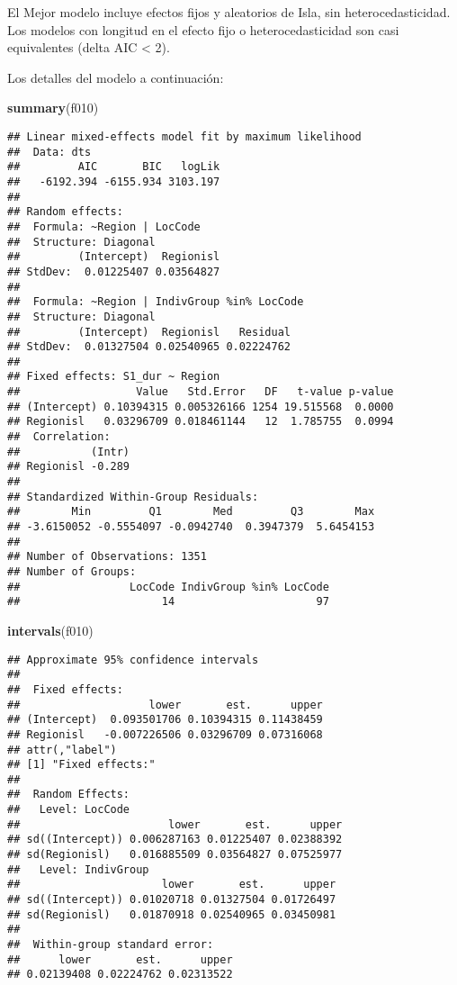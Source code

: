 \documentclass[]{article}
\newenvironment{Shaded}{\begin{snugshade}}{\end{snugshade}}
\newcommand{\KeywordTok}[1]{\textcolor[rgb]{0.13,0.29,0.53}{\textbf{#1}}}
\newcommand{\NormalTok}[1]{#1}
\begin{document}
El Mejor modelo incluye efectos fijos y aleatorios de Isla, sin
heterocedasticidad. Los modelos con longitud en el efecto fijo o
heterocedasticidad son casi equivalentes (delta AIC \textless{} 2).

Los detalles del modelo a continuación:

\begin{Shaded}
\begin{Highlighting}[]
\KeywordTok{summary}\NormalTok{(f010)}
\end{Highlighting}
\end{Shaded}

\begin{verbatim}
## Linear mixed-effects model fit by maximum likelihood
##  Data: dts 
##         AIC       BIC   logLik
##   -6192.394 -6155.934 3103.197
## 
## Random effects:
##  Formula: ~Region | LocCode
##  Structure: Diagonal
##         (Intercept)  Regionisl
## StdDev:  0.01225407 0.03564827
## 
##  Formula: ~Region | IndivGroup %in% LocCode
##  Structure: Diagonal
##         (Intercept)  Regionisl   Residual
## StdDev:  0.01327504 0.02540965 0.02224762
## 
## Fixed effects: S1_dur ~ Region 
##                  Value   Std.Error   DF   t-value p-value
## (Intercept) 0.10394315 0.005326166 1254 19.515568  0.0000
## Regionisl   0.03296709 0.018461144   12  1.785755  0.0994
##  Correlation: 
##           (Intr)
## Regionisl -0.289
## 
## Standardized Within-Group Residuals:
##        Min         Q1        Med         Q3        Max 
## -3.6150052 -0.5554097 -0.0942740  0.3947379  5.6454153 
## 
## Number of Observations: 1351
## Number of Groups: 
##                 LocCode IndivGroup %in% LocCode 
##                      14                      97
\end{verbatim}

\begin{Shaded}
\begin{Highlighting}[]
\KeywordTok{intervals}\NormalTok{(f010)}
\end{Highlighting}
\end{Shaded}

\begin{verbatim}
## Approximate 95% confidence intervals
## 
##  Fixed effects:
##                    lower       est.      upper
## (Intercept)  0.093501706 0.10394315 0.11438459
## Regionisl   -0.007226506 0.03296709 0.07316068
## attr(,"label")
## [1] "Fixed effects:"
## 
##  Random Effects:
##   Level: LocCode 
##                       lower       est.      upper
## sd((Intercept)) 0.006287163 0.01225407 0.02388392
## sd(Regionisl)   0.016885509 0.03564827 0.07525977
##   Level: IndivGroup 
##                      lower       est.      upper
## sd((Intercept)) 0.01020718 0.01327504 0.01726497
## sd(Regionisl)   0.01870918 0.02540965 0.03450981
## 
##  Within-group standard error:
##      lower       est.      upper 
## 0.02139408 0.02224762 0.02313522
\end{verbatim}
\end{document}
